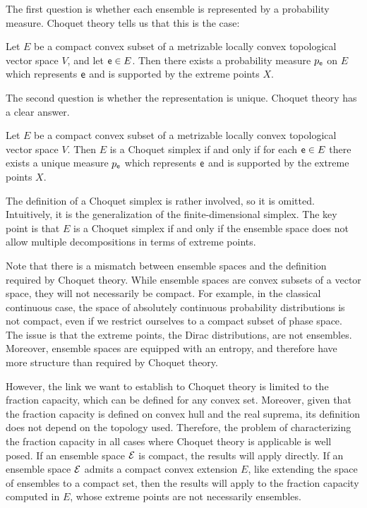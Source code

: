 The first question is whether each ensemble is represented by a probability measure. Choquet theory tells us that this is the case:
\begin{mathSection}
\begin{thrm}\label{pm-es-ChoquetExistence}
	Let $E$ be a compact convex subset of a metrizable locally convex topological vector space $V$, and let $\mathsf{e} \in E$. Then there exists a probability measure $p_{\mathsf{e}}$ on $E$ which represents $\mathsf{e}$ and is supported by the extreme points $X$.
\end{thrm}
\end{mathSection}
The second question is whether the representation is unique. Choquet theory has a clear answer.
\begin{mathSection}
\begin{thrm}\label{pm-es-ChoquetUniqueness}
	Let $E$ be a compact convex subset of a metrizable locally convex topological vector space $V$. Then $E$ is a Choquet simplex if and only if for each $\mathsf{e} \in E$ there exists a unique measure $p_{\mathsf{e}}$ which represents $\mathsf{e}$ and is supported by the extreme points $X$.
\end{thrm}
\end{mathSection}
The definition of a Choquet simplex is rather involved, so it is omitted. Intuitively, it is the generalization of the finite-dimensional simplex. The key point is that $E$ is a Choquet simplex if and only if the ensemble space does not allow multiple decompositions in terms of extreme points.

Note that there is a mismatch between ensemble spaces and the definition required by Choquet theory. While ensemble spaces are convex subsets of a vector space, they will not necessarily be compact. For example, in the classical continuous case, the space of absolutely continuous probability distributions is not compact, even if we restrict ourselves to a compact subset of phase space. The issue is that the extreme points, the Dirac distributions, are not ensembles. Moreover, ensemble spaces are equipped with an entropy, and therefore have more structure than required by Choquet theory.

However, the link we want to establish to Choquet theory is limited to the fraction capacity, which can be defined for any convex set. Moreover, given that the fraction capacity is defined on convex hull and the real suprema, its definition does not depend on the topology used. Therefore, the problem of characterizing the fraction capacity in all cases where Choquet theory is applicable is well posed. If an ensemble space $\mathcal{E}$ is compact, the results will apply directly. If an ensemble space $\mathcal{E}$ admits a compact convex extension $E$, like extending the space of ensembles to a compact set, then the results will apply to the fraction capacity computed in $E$, whose extreme points are not necessarily ensembles.

